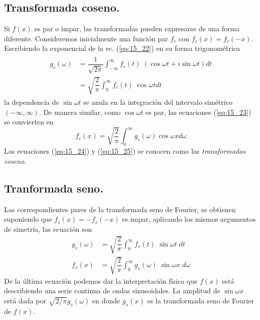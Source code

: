 \subsection{Transformada coseno.}
Si $f(x)$ es par o impar, las transformadas pueden expresarse de una forma diferente. Consideremos inicialmente una función par $f_{c}$ con $f_{c}(x) = f_{c}(-x)$. Escribiendo la exponencial de la ec. (\ref{eq:15_22}) en su forma trigonométrica
\begin{align}
\begin{aligned}
g_{c}(\omega) &= \dfrac{1}{\sqrt{2 \pi}} \int_{-\infty}^{\infty} f_{c} (t) \; (\cos \omega t + i \sin \omega t) dt \\
&= \sqrt{\dfrac{2}{\pi}} \int_{0}^{\infty} f_{c} (t) \; \cos \omega t dt 
\label{eq:15_24}
\end{aligned}
\end{align}
la dependencia de $\sin \omega t$ se anula en la integración del intervalo simétrico $(-\infty, \infty)$. De manera similar, como $\cos \omega t$ es par, las ecuaciones (\ref{eq:15_23}) se convierten en
\begin{equation}
f_{c} (x) = \sqrt{\dfrac{2}{\pi}} \int_{0}^{\infty} g_{c} (\omega) \cos \omega x d \omega 
\label{eq:15_25}
\end{equation}
Las ecuaciones (\ref{eq:15_24}) y (\ref{eq:15_25}) se conocen como las \emph{transformadas coseno}.
\subsection{Tranformada seno.}
Las correspondientes pares de la transformada seno de Fourier, se obtienen suponiendo que $f_{s}(x) = - f_{s}(-x)$ es impar, aplicando los mismos argumentos de simetría, las ecuación son
\begin{align}
g_{s} (\omega) &=  \sqrt{\dfrac{2}{\pi}} \int_{0}^{\infty} f_{s} (t) \; \sin \omega t \; dt \label{eq:15_26} \\
f_{s} (x) &= \sqrt{\dfrac{2}{\pi}} \int_{0}^{\infty} g_{s} (\omega) \; \sin \omega x \; d \omega  \label{eq:15_27}
\end{align}
De la última ecuación podemos dar la interpretación física que $f(x)$ está describiendo una serie continua de ondas sinusoidales. La amplitud de $\sin \omega x$ está dada por $\sqrt{2 / \pi} g_{s} (\omega)$ en donde $g_{s}(x)$ es la transformada seno de Fourier de $f(x)$.
